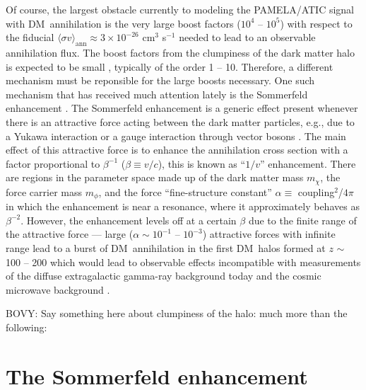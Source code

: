 \documentclass[aps,prd,twocolumn,amsmath,amssymb,floatfix,nofootinbib,10pt]{revtex4}
\newcommand{\eg}{e.g.}
\newcommand{\DM}{DM}
\newcommand{\mdm}{\ensuremath{m_{\chi}}}
\newcommand{\mv}{\ensuremath{m_{\phi}}}
\begin{document}
Of course, the largest obstacle currently to modeling the PAMELA/ATIC
signal with \DM\ annihilation is the very large boost factors ($10^4$
-- $10^5$) with respect to the fiducial $\langle \sigma v
\rangle_{\mathrm{ann}} \approx 3 \times 10^{-26} $ cm$^3$ s$^{-1}$
needed to lead to an observable annihilation flux. The boost factors
from the clumpiness of the dark matter halo is expected to be small
\cite{2008A&A...479..427L,2008Natur.454..735D,2008ApJ...686..262K,2008Natur.456...73S},
typically of the order 1 -- 10. Therefore, a different mechanism must
be reponsible for the large boosts necessary. One such mechanism that
has received much attention lately is the Sommerfeld enhancement
\cite{sommerfeld31a,2003PhRvD..67g5014H,2004PhRvL..92c1303H,2005PhRvD..71f3528H,2005PhRvD..71a5007H,2006PhRvD..73e5004H,2008NuPhB.800..204C,2008JHEP...07..058M,2008arXiv0812.0559M,2008arXiv0812.0360L}. The
Sommerfeld enhancement is a generic effect present whenever there is
an attractive force acting between the dark matter particles, \eg, due
to a Yukawa interaction or a gauge interaction through vector bosons
\cite{ArkaniHamed:2008qn}. The main effect of this attractive force is
to enhance the annihilation cross section with a factor proportional
to $\beta^{-1}$ ($\beta \equiv v/c$), this is known as ``$1/v$''
enhancement. There are regions in the parameter space made up of the
dark matter mass \mdm, the force carrier mass \mv, and the force
``fine-structure constant'' $\alpha \equiv$ coupling$^2$/$4 \pi$ in
which the enhancement is near a resonance, where it approximately
behaves as $\beta^{-2}$. However, the enhancement levels off at a
certain $\beta$ due to the finite range of the attractive force ---
large ($\alpha \sim\!10^{-1}$ -- $10^{-3}$) attractive forces with
infinite range lead to a burst of \DM\ annihilation in the first \DM\
halos formed at $z$ $\sim$ 100 -- 200 which would lead to observable
effects incompatible with measurements of the diffuse extragalactic
gamma-ray background today and the cosmic microwave background
\cite{2008arXiv0810.3233K}.



BOVY: Say something here about clumpiness of the halo: much more than
the following: \cite{1998MNRAS.300..146G,johnston98a,2003MNRAS.339..834H,2008ApJ...688..277T,2002MNRAS.330..778W,2002MNRAS.330..792K,koposov,Koposov:2009ru}



\section{The Sommerfeld enhancement}
\end{document}
